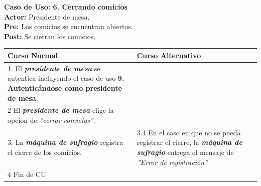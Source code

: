 \documentclass[spanish, 10pt,a4paper]{article}
\numberwithin{equation}{section} %
\begin{document}
\noindent\textbf{Caso de Uso: 6. Cerrando comicios}\\
\textbf{Actor: } Presidente de mesa.\\
\textbf{Pre: } Los comicios se encuentran abiertos.\\
\textbf{Post: } Se cierran los comicios.\\
\begin{table}[H]
  \centering
\bgroup
\def\arraystretch{1.3}
  \begin{tabular}{p{9cm} | p{7cm}}
    \hline
    Curso Normal & Curso Alternativo \\
    \hline
    \hline    
	1. El \textbf{\textit{presidente de mesa}} se autentica incluyendo el caso de uso \textbf{ 9. Autenticándose como presidente de mesa}. 
    \\
    \hline
    2 El \textbf{\textit{presidente de mesa}} elige la opcion de \textit{''cerrar comicios''}.
    & \\
    
    \hline
    3. La \textbf{\textit{máquina de sufragio}} registra el cierre de los comicios.
    &
    3.1 En el caso en que no se pueda registrar el cierre, la \textbf{\textit{máquina de sufragio}} entrega el mensaje de \textit{''Error de registración''}
    \\
    
    \hline
    4 Fin de CU
    & \\
    \hline
  \end{tabular}
\egroup
\end{table}
\end{document}
